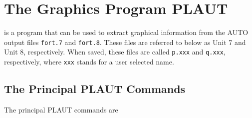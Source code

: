 


\section{The Graphics Program PLAUT}

 is a program that can be used to extract graphical
information from the AUTO output files {\tt fort.7} and {\tt fort.8}.
These files are referred to below as Unit 7 and Unit 8, respectively.
When saved, these files are called {\tt p.xxx} and {\tt q.xxx}, respectively,
 where {\tt xxx} stands for a user selected name.

\subsection{The Principal PLAUT Commands}

The principal PLAUT commands are 

